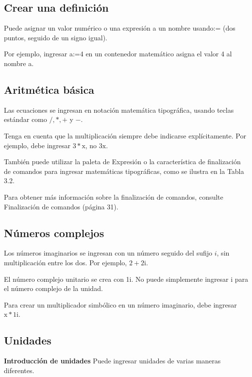 \subsection{Crear una definición}
Puede asignar un valor numérico o una expresión a un nombre usando:= (dos puntos, seguido de un signo igual).

Por ejemplo, ingresar a:=4 en un contenedor matemático asigna el valor 4 al nombre a.

\subsection{Aritmética básica}
Las ecuaciones se ingresan en notación matemática tipográfica, usando teclas estándar como $/, *,+$ y $-$.

Tenga en cuenta que la multiplicación siempre debe indicarse explícitamente. Por ejemplo, debe ingresar $3 * \mathrm{x}$, no $3 \mathrm{x}$.

También puede utilizar la paleta de Expresión o la característica de finalización de comandos para ingresar matemáticas tipográficas, como se ilustra en la Tabla 3.2. 




Para obtener más información sobre la finalización de comandos, consulte Finalización de comandos (página 31).

\subsection{Números complejos}
Los números imaginarios se ingresan con un número seguido del sufijo $i$, sin multiplicación entre los dos. Por ejemplo, $2+2 \mathrm{i}$.

El número complejo unitario se crea con 1i. No puede simplemente ingresar i para el número complejo de la unidad.

Para crear un multiplicador simbólico en un número imaginario, debe ingresar $\mathrm{x} * 1 \mathrm{i}$.

\subsection{Unidades}
\textbf{Introducción de unidades}
Puede ingresar unidades de varias maneras diferentes.

